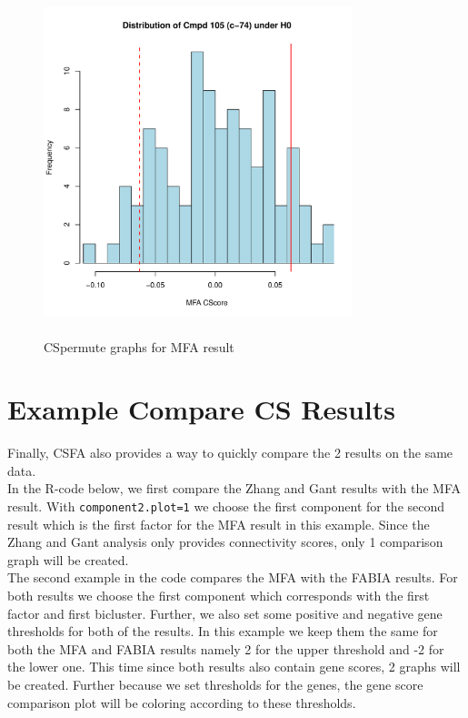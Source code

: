 \documentclass[a4paper]{article}\usepackage[]{graphicx}\usepackage[]{color}
\newenvironment{knitrout}{}{} %
\begin{document}
\begin{knitrout}
\begin{figure}[H]
\includegraphics[width=9cm,height=10cm]{figure/CSpermuteplots-3} \hfill{}

\caption[CSpermute graphs for MFA result]{CSpermute graphs for MFA result\label{fig:CSpermuteplots}}
\end{figure}


\end{knitrout}

\section{Example Compare CS Results}
Finally, CSFA also provides a way to quickly compare the 2 results on the same
data.\\
In the R-code below, we first compare the Zhang and Gant results with the MFA
result. With \texttt{component2.plot=1} we choose the first component for the
second result which is the first factor for the MFA result in this example.
Since the Zhang and Gant analysis only provides connectivity scores, only 1
comparison graph will be created.\\
The second example in the code compares the MFA with the FABIA results. For both
results we choose the first component which corresponds with the first factor
and first bicluster. Further, we also set some positive and negative gene
thresholds for both of the results. In this example we keep them the same for
both the MFA and FABIA results namely 2 for the upper threshold and -2 for the
lower one. This time since both results also contain gene scores, 2 graphs will
be created. Further because we set thresholds for the genes, the gene score
comparison plot will be coloring according to these thresholds.
\end{document}
